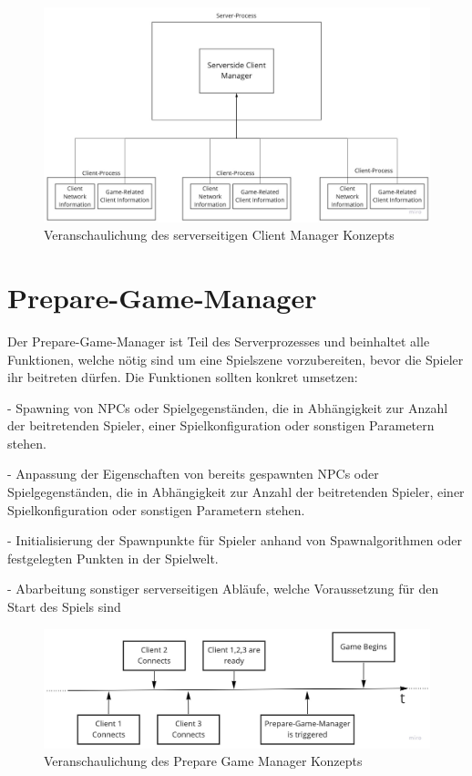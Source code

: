 \begin{figure}
	\centering
	\includegraphics[width=150mm]{images/serversided_client_manager.jpg}
	\caption[Serversided Client Manager]{Veranschaulichung des serverseitigen Client Manager Konzepts}
	\label{pic:serversided_client_manager}
\end{figure}

\section{Prepare-Game-Manager}

Der Prepare-Game-Manager ist Teil des Serverprozesses und beinhaltet alle Funktionen, welche nötig sind um eine Spielszene vorzubereiten, bevor die Spieler ihr beitreten dürfen. Die Funktionen sollten konkret umsetzen:

- Spawning \cite{Wikipedia.2020} von NPCs \cite{Wikipedia.2021f} oder Spielgegenständen, die in Abhängigkeit zur Anzahl der beitretenden Spieler, einer Spielkonfiguration oder sonstigen Parametern stehen.

- Anpassung der Eigenschaften von bereits gespawnten NPCs oder Spielgegenständen, die in Abhängigkeit zur Anzahl der beitretenden Spieler, einer Spielkonfiguration oder sonstigen Parametern stehen.

- Initialisierung der Spawnpunkte für Spieler anhand von Spawnalgorithmen oder festgelegten Punkten in der Spielwelt.

- Abarbeitung sonstiger serverseitigen Abläufe, welche Voraussetzung für den Start des Spiels sind

\begin{figure}
	\centering
	\includegraphics[width=150mm]{images/prepare_game_manager.jpg}
	\caption[Prepare-Game-Manager]{Veranschaulichung des Prepare Game Manager Konzepts}
	\label{pic:prepare_game_manager}
\end{figure}

